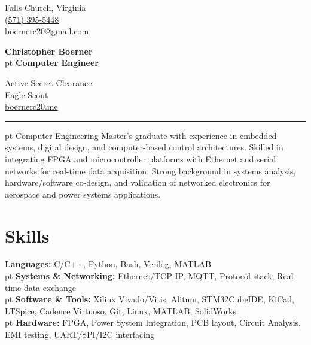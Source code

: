 \documentclass[9pt, letterpaper]{extarticle}
\newenvironment{threecolentry}[3][]{
    \onecolentry
    \def\thirdColumn{#3}
    \setcolumnwidth{, \fill, \fill, \fill}
    \begin{paracol}{3}
    {\raggedright #2} \switchcolumn
    \begin{center}  %
}{
    \end{center}
    \switchcolumn \raggedleft \thirdColumn
    \end{paracol}
    \endonecolentry
} %
\let\hrefWithoutArrow\href
\begin{document}
    \newcommand{\AND}{\unskip
        \cleaders\copy\ANDbox\hskip\wd\ANDbox
        \ignorespaces
    }
    \newsavebox\ANDbox
    \sbox\ANDbox{$|$}
    \begin{threecolentry}
        {
            Falls Church, Virginia\\
            \hrefWithoutArrow{tel:+1-571-395-5448}{(571) 395-5448}\\
            \hrefWithoutArrow{mailto:boernerc20@gmail.com}{boernerc20@gmail.com}
        }
        {
            Active Secret Clearance \\
            Eagle Scout \\
            \hrefWithoutArrow{https://www.boernerc20.me}{boernerc20.me} \\
        }
        {
            \Huge\textbf{{Christopher Boerner}}\\
             pt%
            \Large{\textbf{Computer Engineer}}
        }
    \end{threecolentry}
    \hrule
     pt%
    Computer Engineering Master's graduate with experience in embedded systems, digital design, and computer-based control architectures. Skilled in integrating FPGA and microcontroller platforms with Ethernet and serial networks for real-time data acquisition. Strong background in systems analysis, hardware/software co-design, and validation of networked electronics for aerospace and power systems applications.

    \section{Skills}
    \textbf{Languages: }C/C++, Python, Bash, Verilog, MATLAB\\
     pt%
    \textbf{Systems \& Networking: }Ethernet/TCP-IP, MQTT, Protocol stack, Real-time data exchange\\
     pt%
    \textbf{Software \& Tools: }Xilinx Vivado/Vitis, Alitum, STM32CubeIDE, KiCad, LTSpice, Cadence Virtuoso, Git, Linux, MATLAB, SolidWorks\\
     pt%
    \textbf{Hardware: }FPGA, Power System Integration, PCB layout, Circuit Analysis, EMI testing, UART/SPI/I2C interfacing\\
    
\end{document}
